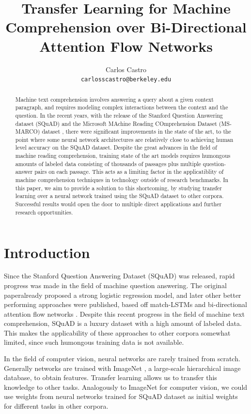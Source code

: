 \documentclass[11pt,a4paper]{article}
\title{Transfer Learning for Machine Comprehension over Bi-Directional Attention Flow Networks}
\author{Carlos Castro \\
  {\tt carlosscastro@berkeley.edu} }
\date{}
\begin{document}
\maketitle
\begin{abstract}

Machine text comprehension involves answering a query about a given context paragraph, and requires modeling complex interactions between the context and the question. In the recent years, with the release of the  Stanford Question Answering dataset (SQuAD) \cite{squad:2016} and the Microsoft MAchine Reading COmprehension Dataset (MS-MARCO) dataset \cite{msmarco:2016}, there were significant improvements in the state of the art, to the point where some neural network architectures are relatively close to achieving human level accuracy on the SQuAD dataset. Despite the great advances in the field of machine reading comprehension, training state of the art models requires humongous amounts of labeled data consisting of thousands of passages plus multiple question-answer pairs on each passage. This acts as a limiting factor in the applicatiblity of machine comprehension techniques in technology outside of research benchmarks. In this paper, we aim to provide a solution to this shortcoming, by studying transfer learning over a neural network trained using the SQuAD dataset to other corpora. Successful results would open the door to multiple direct applications and further research opportunities.

\end{abstract}


\section{Introduction}

Since the Stanford Question Answering Dataset (SQuAD) \cite{squad:2016} was released, rapid progress was made in the field of machine question answering. The original paperalready proposed a strong logistic regression model, and later other better performing approaches were published, based off match-LSTMs \cite{matchlstm} and bi-directional attention flow networks \cite{bidaf:2017}. Despite this recent progress in the field of machine text comprehension, SQuAD is a luxury dataset with a high amount of labeled data. This makes the applicability of these approaches to other corpora somewhat limited, since such humongous training data is not available. 

In the field of computer vision, neural networks are rarely trained from scratch. Generally networks are trained with ImageNet \cite{imagenet}, a large-scale hierarchical image database, to obtain features. Transfer learning allows us to transfer this knowledge to other tasks. Analogously to ImageNet for computer vision, we could use weights from neural networks trained for SQuAD dataset as initial weights for different tasks in other corpora. 
\end{document}
